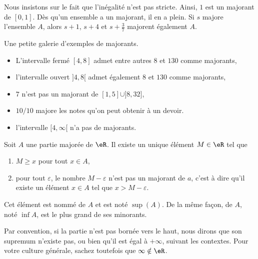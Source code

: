 Nous insistons sur le fait que l'inégalité n'est pas stricte. Ainsi, $1$ est un majorant de $[0,1]$. Dès qu'un ensemble a un majorant, il en a plein. Si $s$ majore l'ensemble $A$, alors $s+1$, $s+4$ et \( s+\frac{ 3 }{ 7 }\) majorent également $A$.

\begin{example}
Une petite galerie d'exemples de majorants.
\begin{itemize}
\item L'intervalle fermé $[4,8]$ admet entre autres $8$ et $130$ comme majorants,
\item l'intervalle ouvert $]4,8[$ admet également $8$ et $130$ comme majorants,
\item $7$ n'est pas un majorant de $[1,5]\cup]8,32]$,
\item $10/10$ majore les notes qu'on peut obtenir à un devoir.
\item l'intervalle $[4,\infty[$ n'a pas de majorants.
\end{itemize}
\end{example}

\begin{propositionDef}		\label{DefSupeA}
    Soit $A$ une partie majorée de $\eR$. Il existe un unique élément \( M\in \eR\) tel que
    \begin{enumerate}
        \item
            $M\geq x$ pour tout $x\in A$,
        \item
            pour tout $\varepsilon$, le nombre $M-\varepsilon$ n'est pas un majorant de $a$, c'est à dire qu'il existe un élément $x\in A$ tel que $x>M-\varepsilon$.
    \end{enumerate}

    Cet élément est nommé  de $A$ et est noté \( \sup(A)\). De la même façon,  de $A$, noté $\inf A$, est le plus grand de ses minorants.
\end{propositionDef}

Par convention, si la partie n'est pas bornée vers le haut, nous dirons que son supremum n'existe pas, ou bien qu'il est égal à $+\infty$, suivant les contextes. Pour votre culture générale, sachez toutefois que $\infty\notin\eR$.

